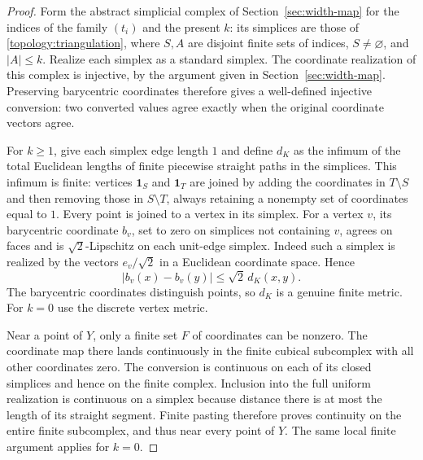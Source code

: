 \begin{proof}
Form the abstract simplicial complex of Section~\ref{sec:width-map}
for the indices of the family $(t_i)$ and the present $k$: its
simplices are those of \eqref{topology:triangulation}, where $S,A$ are
disjoint finite sets of indices, $S\ne\varnothing$, and $|A|\le k$.
Realize each simplex as a standard simplex.  The coordinate realization
of this complex is injective, by the argument given in
Section~\ref{sec:width-map}.  Preserving barycentric coordinates
therefore gives a well-defined injective conversion: two converted
values agree exactly when the original coordinate vectors agree.

For $k\ge1$, give each simplex edge length $1$ and define $d_K$
as the infimum of the total Euclidean lengths of finite piecewise
straight paths in the simplices.  This infimum is finite: vertices
$\mathbf1_S$ and $\mathbf1_T$ are joined by adding the coordinates
in $T\setminus S$ and then removing those in $S\setminus T$, always
retaining a nonempty set of coordinates equal to $1$.  Every point
is joined to a vertex in its simplex.  For a vertex $v$, its
barycentric coordinate $b_v$, set to zero on simplices not containing
$v$, agrees on faces and is $\sqrt2$-Lipschitz on each unit-edge
simplex.  Indeed such a simplex is realized by the vectors
$e_v/\sqrt2$ in a Euclidean coordinate space.  Hence
\[
 |b_v(x)-b_v(y)|\le\sqrt2\,d_K(x,y).
\]
The barycentric coordinates distinguish points, so $d_K$ is a genuine
finite metric.  For $k=0$ use the discrete vertex metric.

Near a point of $Y$, only a finite set $F$ of coordinates can be
nonzero.  The coordinate map there lands continuously in the finite
cubical subcomplex with all other coordinates zero.  The conversion
is continuous on each of its closed simplices and hence on the finite
complex.  Inclusion into the full uniform realization is continuous
on a simplex because distance there is at most the length of its
straight segment.  Finite pasting therefore proves continuity on
the entire finite subcomplex, and thus near every point of $Y$.
The same local finite argument applies for $k=0$.
\end{proof}

